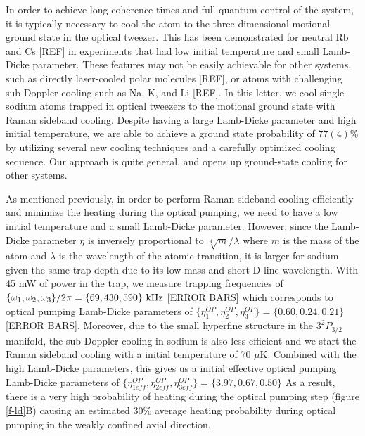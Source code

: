 \documentclass[aps,prl,twocolumn,groupedaddress]{revtex4-1}
\begin{document}
In order to achieve long coherence times and full quantum control of the system,
it is typically necessary to cool the atom to the
three dimensional motional ground state in the optical tweezer.
This has been demonstrated for neutral Rb\cite{Thompson2013,Kaufman2012} and Cs [REF] in experiments that had low initial temperature and small Lamb-Dicke parameter.
These features
may not be easily achievable for other systems, such as directly laser-cooled polar molecules [REF],
or atoms with challenging sub-Doppler cooling such as Na, K, and Li [REF].
In this letter, we cool single sodium atoms
trapped in optical tweezers to the motional ground state with Raman sideband cooling.
Despite having a large Lamb-Dicke parameter and high initial temperature, we are able to achieve a ground state probability of $77(4)\%$
by utilizing several new cooling techniques and a carefully optimized cooling sequence.  Our approach is quite general, and opens up ground-state cooling for other systems.

As mentioned previously, in order to perform Raman sideband cooling efficiently and
minimize the heating during the optical pumping, we need to have a low initial temperature and
a small Lamb-Dicke parameter. However, since the Lamb-Dicke parameter $\eta$ is inversely
proportional to $\sqrt[4]{m}/\lambda$ where $m$ is the mass of the atom and $\lambda$
is the wavelength of the atomic transition,
it is larger for sodium given the same trap depth due to its low mass and short D line wavelength.
With 45 mW of power in the trap, we measure trapping frequencies of
$\{\omega_1,\omega_2,\omega_3\}/2\pi = \{69, 430, 590\}\ \text{\text{kHz}}$ [ERROR BARS]
which corresponds to optical pumping Lamb-Dicke parameters of
$\{\eta^{OP}_1,\eta^{OP}_2,\eta^{OP}_3\} = \{0.60, 0.24, 0.21\}$ [ERROR BARS].
Moreover, due to the small hyperfine structure in the $3^2P_{3/2}$ manifold,
the sub-Doppler cooling in sodium is also less efficient and we start the
Raman sideband cooling with a initial temperature of 70 $\mu$K. Combined with the high Lamb-Dicke
parameters, this gives us a initial effective optical pumping Lamb-Dicke parameters of
$\{\eta^{OP}_{1eff},\eta^{OP}_{2eff},\eta^{OP}_{3eff}\} = \{3.97, 0.67, 0.50\}$
As a result, there is a very high probability of heating during the optical pumping step
(figure \ref{f-ld}B) causing an estimated $30\%$ average heating probability during optical pumping
in the weakly confined axial direction.
\end{document}
